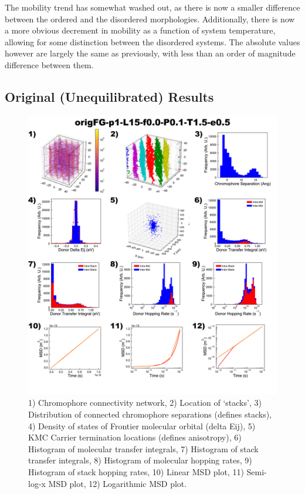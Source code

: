 \documentclass[12pt]{article}
\begin{document}
The mobility trend has somewhat washed out, as there is now a smaller difference between the ordered and the disordered morphologies.
Additionally, there is now a more obvious decrement in mobility as a function of system temperature, allowing for some distinction between the disordered systems.
The absolute values however are largely the same as previously, with less than an order of magnitude difference between them.


\subsection{Original (Unequilibrated) Results}


\begin{figure}[h]\centering
	\includegraphics[width=\textwidth]{Figures/origFG-p1-L15-f0.0-P0.1-T1.5-e0.5.png}
    \caption{   1) Chromophore connectivity network, 
                2) Location of `stacks', 
                3) Distribution of connected chromophore separations (defines stacks),
                4) Density of states of Frontier molecular orbital (delta Eij),
                5) KMC Carrier termination locations (defines anisotropy),
                6) Histogram of molecular transfer integrals,
                7) Histogram of stack transfer integrals,
                8) Histogram of molecular hopping rates,
                9) Histogram of stack hopping rates,
                10) Linear MSD plot,
                11) Semi-log-x MSD plot,
                12) Logarithmic MSD plot.}
	\label{fig:UneqlT1.5}
\end{figure}
\end{document}
